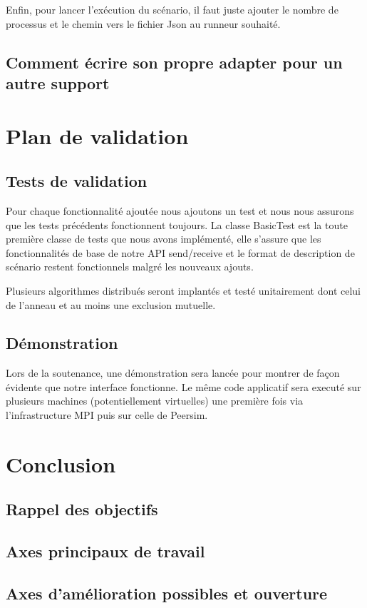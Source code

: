 \documentclass{article}
\begin{document}
			Enfin, pour lancer l'exécution du scénario, il faut juste ajouter le nombre de processus et le chemin vers le fichier Json au runneur souhaité.
		\subsection{Comment écrire son propre adapter pour un autre support}

		\newpage
		\section{Plan de validation}
		\subsection{Tests de validation}
		Pour chaque fonctionnalité ajoutée nous ajoutons un test et nous nous assurons que les tests précédents fonctionnent toujours.
		\newline
		La classe BasicTest est la toute première classe de tests que nous avons implémenté, elle s'assure que les fonctionnalités de base de notre API
		send/receive et le format de description de scénario restent fonctionnels malgré les nouveaux ajouts.

		Plusieurs algorithmes distribués seront implantés et testé unitairement dont celui de l'anneau et au moins une exclusion mutuelle.
		\subsection{Démonstration}
		Lors de la soutenance, une démonstration sera lancée pour montrer de façon évidente que notre interface fonctionne.
		Le même code applicatif sera executé sur plusieurs machines (potentiellement virtuelles) une première fois via l'infrastructure MPI puis sur celle de Peersim.
		
		\newpage
		\section{Conclusion}
		\subsection{Rappel des objectifs}
		\subsection{Axes principaux de travail}
		\subsection{Axes d'amélioration possibles et ouverture}
		
		
\end{document}
